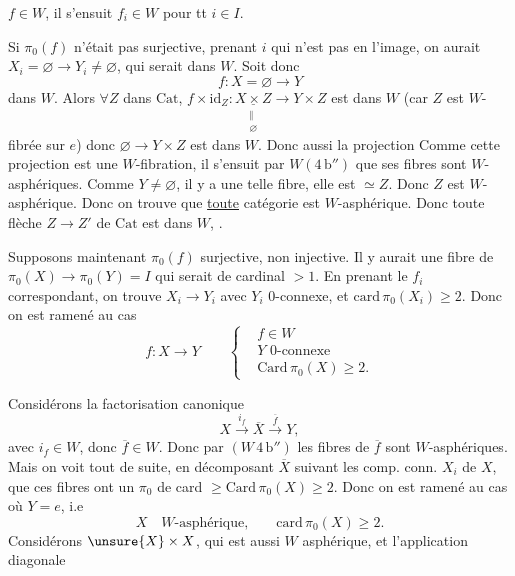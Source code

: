 
 $f\in W$, il s'ensuit $f_i\in W$ pour tt $i\in I$.

Si $\pi_0(f)$ n'était pas surjective, prenant $i$ qui n'est pas en l'image, on aurait $X_i=\varnothing\longrightarrow Y_i\ne\varnothing$, qui serait dans $W$. Soit donc \[f:X=\varnothing\longrightarrow Y\] dans $W$. Alors $\forall Z$ dans $\mathrm{Cat}$, $f\times\mathrm{id}_Z:\underset{\substack{\Vert\\\varnothing}}{\underline{X\times Z}}\longrightarrow Y\times Z$ est dans $W$ (car $Z$ est $W$-fibrée sur $e$) donc $\varnothing\longrightarrow Y\times Z$ est dans $W$. Donc aussi la projection  Comme cette projection est une $W$-fibration, il s'ensuit  par $W(4\,\mathrm b'')$ que ses fibres sont $W$-asphériques. Comme $Y\ne\varnothing$, il y a une telle fibre, elle est $\simeq Z$. Donc $Z$ est $W$-asphérique.  Donc on trouve que \uline{toute} catégorie  est $W$-asphérique. Donc toute flèche $Z\longrightarrow Z'$ de $\mathrm{Cat}$ est dans $W$, .

Supposons maintenant $\pi_0(f)$ surjective,  non injective. Il y aurait une fibre de $\pi_0(X)\longrightarrow\pi_0(Y)=I$ qui serait de cardinal $>1$. En prenant le $f_i$ correspondant, on trouve $X_i\longrightarrow Y_i$ avec $Y_i$ 0-connexe, et $\mathrm{card}\,\pi_0(X_i)\geq2$.  Donc on est ramené au cas \[f:X\longrightarrow Y\qquad\left\{\begin{aligned}&f\in W\\&Y\text{ 0-connexe}\\&\mathrm{Card}\,\pi_0(X)\geq2.\end{aligned}\right.\]

Considérons la factorisation canonique \[X\xrightarrow{i_f}\overline X\xrightarrow{\overline f}Y,\] avec $i_f\in W$, donc $\overline f\in W$. Donc par $(W\,4\,\mathrm b'')$ les fibres de $\overline f$ sont $W$-asphériques. Mais on voit tout de suite,  en décomposant $\overline X$ suivant les comp. conn. $X_i$ de $X$, que ces fibres ont un $\pi_0$ de card $\geq\mathrm{Card}\,\pi_0(X)\geq2$. Donc on est ramené au cas où $Y=e$, i.e \[X\quad W\text{-asphérique,}\qquad \mathrm{card}\,\pi_0(X)\geq2.\] Considérons $\unsure{X}\times X$, qui est aussi $W$ asphérique, et l'application diagonale

